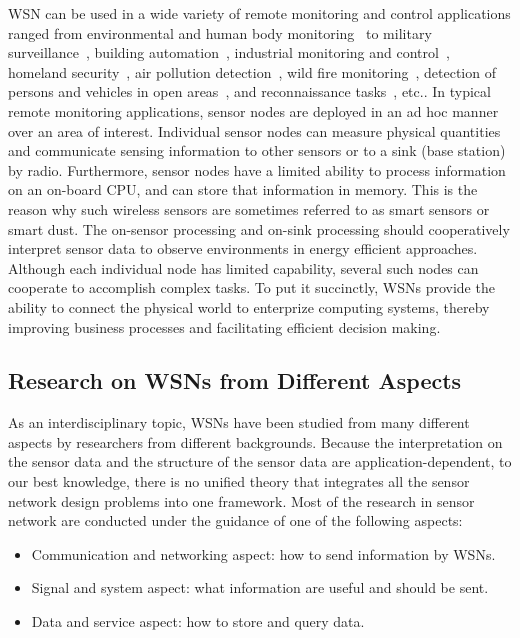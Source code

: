 WSN can be used in a wide variety of remote monitoring and control applications ranged from environmental and human body monitoring~\cite{MalanCodeBlue}
 to military surveillance~\cite{OgrenCooperativeControl, dutta06radar, DutteLitespaper}, building automation~\cite{Crossbow2006}, industrial monitoring and control~\cite{KevanShipboardPM06}, homeland security~\cite{SimonCountersniper2004}, air pollution detection~\cite{LiuDualSpaceAppTracking}, wild fire monitoring~\cite{DoolinaFirebugSPIE05}, detection of persons and
vehicles in open areas~\cite{DuttamirMote}, and reconnaissance tasks~\cite{ZhaoGuibasWSN2004}, etc..
    In typical remote monitoring applications, sensor nodes are deployed in an ad hoc manner over an area of interest.
Individual sensor nodes can measure physical quantities and communicate sensing information to other sensors or to a sink (base station) by radio. Furthermore, sensor nodes have a limited ability to process information on an on-board CPU, and can store that information in memory. This is the reason why such wireless sensors are sometimes referred to as smart sensors or smart dust. The
on-sensor processing and on-sink processing should cooperatively interpret sensor data to observe environments in energy efficient approaches. Although each individual node has limited capability, several such nodes can cooperate to accomplish complex tasks. To put it succinctly, WSNs provide the ability to connect the physical world to enterprize computing systems, thereby improving business processes and facilitating efficient decision making.



\subsection{Research on WSNs from Different Aspects}
As an interdisciplinary topic, WSNs have been studied from many different aspects by researchers from different backgrounds. Because the interpretation on the sensor data and the structure of the sensor data are application-dependent, to our best knowledge, there is no unified theory that integrates all the sensor network design problems into one framework. Most of the research in sensor network are conducted under the guidance of one of the following aspects:
\begin{itemize}
  \item Communication and networking aspect: how to send information by WSNs.
  \item Signal and system aspect: what information are useful and should be sent.
  \item Data and service aspect: how to store and query data.
\end{itemize}

